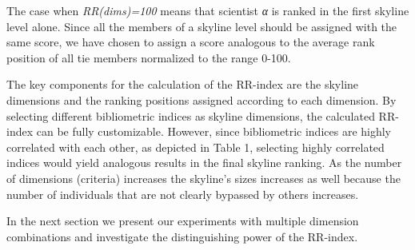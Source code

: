 
The case when \emph{RR(dims)=100} means that scientist \emph{α} is
ranked in the ﬁrst skyline level alone. Since all the members of a
skyline level should be assigned with the same score, we have chosen to
assign a score analogous to the average rank position of all tie members
normalized to the range 0-100.

The key components for the calculation of the RR-index are the skyline
dimensions and the ranking positions assigned according to each
dimension. By selecting different bibliometric indices as skyline
dimensions, the calculated RR-index can be fully customizable. However,
since bibliometric indices are highly correlated with each other, as
depicted in Table 1, se­lecting highly correlated indices would yield
analogous results in the final skyline ranking. As the number of
dimensions (criteria) increases the skyline's sizes increases as well
because the number of individuals that are not clearly bypassed by
others increases.

In the next section we present our experiments with multiple dimension
combinations and investigate the distinguishing power of the RR-index.